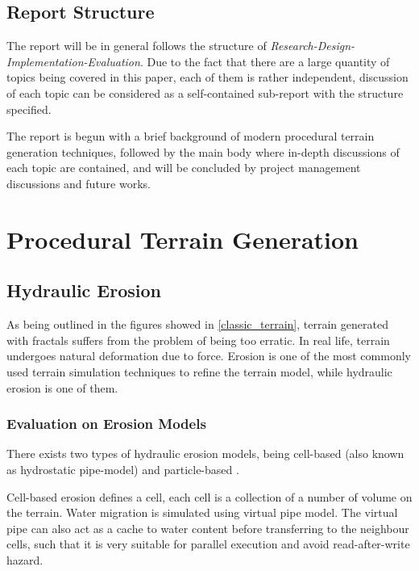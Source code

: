 \documentclass[oneside, a4paper]{report}
\begin{document}
    \section{Report Structure}

    The report will be in general follows the structure of \textit{Research-Design-Implementation-Evaluation}.
    Due to the fact that there are a large quantity of topics being covered in this paper, each of them is rather independent, discussion of each topic can be considered as a self-contained sub-report with the structure specified.

    The report is begun with a brief background of modern procedural terrain generation techniques, followed by the main body where in-depth discussions of each topic are contained, and will be concluded by project management discussions and future works.

    \chapter{Procedural Terrain Generation}

    \section{Hydraulic Erosion}

    As being outlined in the figures showed in \ref{classic_terrain}, terrain generated with fractals suffers from the problem of being too erratic. In real life, terrain undergoes natural deformation due to force. Erosion is one of the most commonly used terrain simulation techniques to refine the terrain model, while hydraulic erosion is one of them.

    \subsection{Evaluation on Erosion Models}

    There exists two types of hydraulic erosion models, being cell-based (also known as hydrostatic pipe-model) \cite{cell_based_erosion} and particle-based \cite{particle_based_erosion}.

    Cell-based erosion defines a cell, each cell is a collection of a number of volume on the terrain. Water migration is simulated using virtual pipe model. The virtual pipe can also act as a cache to water content before transferring to the neighbour cells, such that it is very suitable for parallel execution \cite{cell_based_gpu} and avoid read-after-write hazard.
\end{document}
